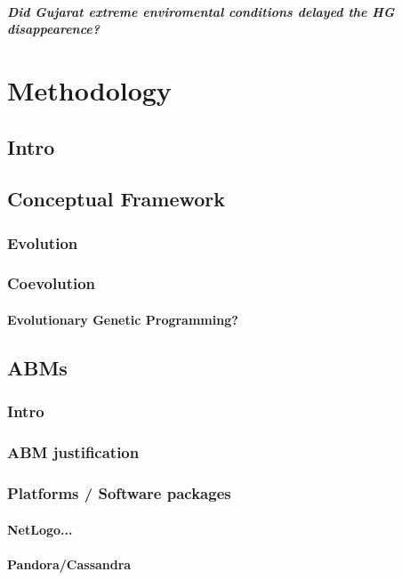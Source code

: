 \documentclass{report}
\begin{document}
			\paragraph{Did Gujarat extreme enviromental conditions delayed the HG disappearence?}
			
\newpage 
\chapter{Methodology}
	\section{Intro}

	\section{Conceptual Framework}
		\subsection{Evolution}
		\subsection{Coevolution}
			\subsubsection{Evolutionary \/ Genetic Programming?}
	\section{ABMs}
	  \subsection{Intro}
	  \subsection{ABM justification}		
	   \subsection{Platforms / Software packages}
		\subsubsection{NetLogo...}
		\subsubsection{Pandora/Cassandra}
\end{document}
